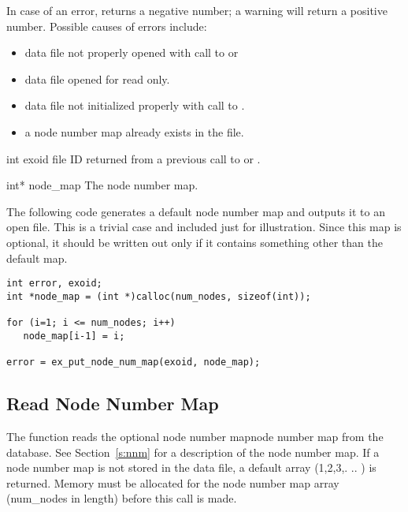In case of an error,  returns a
negative number; a warning will return a positive number. Possible
causes of errors include:

\begin{itemize}
 \item data file not properly opened with call to 
 or 

 \item data file opened for read only.

 \item data file not initialized properly with call to .

 \item a node number map already exists in the file.
\end{itemize}



\begin{parameters}
\item[{int exoid \R{}}]
\exo{} file ID returned from a previous call to  
or .

\item[{int* node_map \R{}}]
The node number map.
\end{parameters}

The following code generates a default node number map and outputs it
to an open \exo{} file. This is a trivial case and included just for
illustration. Since this map is optional, it should be written out
only if it contains something other than the default map.

\begin{lstlisting}
int error, exoid;
int *node_map = (int *)calloc(num_nodes, sizeof(int));

for (i=1; i <= num_nodes; i++)
   node_map[i-1] = i;

error = ex_put_node_num_map(exoid, node_map);
\end{lstlisting}

\subsection{Read Node Number Map}

The function  reads the optional node
number mapnode number map from the database. See Section~\ref{s:nnm} for a
description of the node number map. If a node number map is
not stored in the data file, a default array (1,2,3,. .. )
is returned. Memory must be allocated for the node number map array
({num_nodes} in length) before this call is made.

